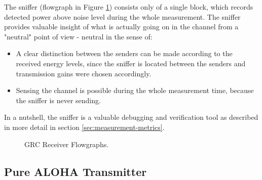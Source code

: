 The sniffer (flowgraph in Figure \ref{fig:grc-sniffer}) consists only of a single  block, which records detected power above noise level during the whole measurement. The sniffer provides valuable insight of what is actually going on in the channel from a "neutral" point of view - neutral in the sense of:

\begin{itemize}
	\item A clear distinction between the senders can be made according to the received energy levels, since the sniffer is located between the senders and transmission gains were chosen accordingly.
	\item Sensing the channel is possible during the whole measurement time, because the sniffer is never sending.
\end{itemize}

In a nutshell, the sniffer is a valuable debugging and verification tool as described in more detail in section \ref{sec:measurement-metrics}.

\begin{figure}
	\begin{center}
		\label{fig:grc-receiver}
		\vskip 40pt
		\label{fig:grc-sniffer}
	\end{center}
	\caption{GRC Receiver Flowgraphs.}
\end{figure}

\subsection{Pure ALOHA Transmitter}
\label{sec:aloha-sender}

